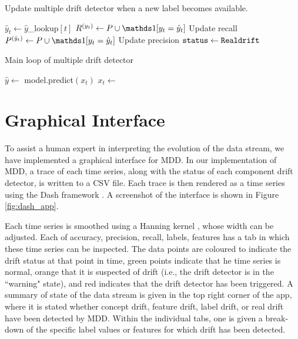 \begin{algorithm}
    \caption{Update multiple drift detector when a new label becomes available.}
    \label{alg:mdd_label}
    \begin{algorithmic}
            \State $\hat{y}_t \gets \hat{y}$\_lookup$[t]$
            \State $R^{(y_t)}\gets P\cup \id{y_t=\hat{y}_t}$
            \Comment Update recall
            \State $P^{(\hat{y}_t)}\gets P\cup \id{y_t=\hat{y}_t}$
            \Comment Update precision
              \State ${\tt status} \gets {\tt Real drift}$
            \EndIf
        \EndFunction
    \end{algorithmic}
\end{algorithm}

\begin{algorithm}
    \caption{Main loop of multiple drift detector}
    \label{alg:mdd_loop}
    \begin{algorithmic}
        \State {}
            \State $\hat{y} \gets$ model.predict$(x_t)$
            \State $x_t \gets $
            \State {}
            \State {}
            \State {}
          \EndIf
        \EndWhile
    \end{algorithmic}
\end{algorithm}


\section{Graphical Interface} \label{mdd:graphics}

To assist a human expert in interpreting the evolution of the data stream, we have implemented a graphical interface for MDD. In our implementation of MDD, a trace of each time series, along with the status of each component drift detector, is written to a CSV file. Each trace is then rendered as a time series using the Dash framework \cite{dash}. A screenshot of the interface is shown in Figure \ref{fig:dash_app}.

Each time series is smoothed using a Hanning kernel \cite{hanning}, whose width can be adjusted. Each of accuracy, precision, recall, labels, features has a tab in which these time series can be inspected. The data points are coloured to indicate the drift status at that point in time, green points indicate that he time series is normal, orange that it is suspected of drift (i.e., the drift detector is in the ``warning" state), and red indicates that the drift detector has been triggered. A summary of state of the data stream is given in the top right corner of the app, where it is stated whether concept drift, feature drift, label drift, or real drift have been detected by MDD. Within the individual tabs, one is given a break-down of the specific label values or features for which drift has been detected.

